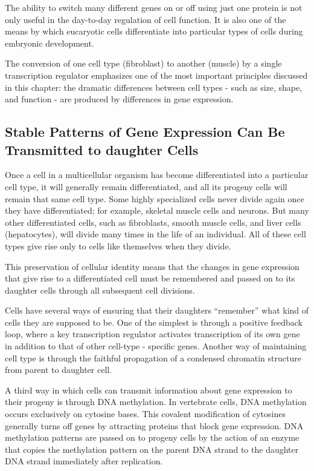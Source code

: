 The ability to switch many different genes on or off using just one protein
is not only useful in the day-to-day regulation of cell function. It is also
one of the means by which eucaryotic cells differentiate into particular
types of cells during embryonic development.

The conversion of one cell type (fibroblast) to another (muscle) by a single
transcription regulator emphasizes one of the most important principles
discussed in this chapter: the dramatic differences between cell types -
such as size, shape, and function - are produced by differences in gene
expression.

\subsection{Stable Patterns of Gene Expression Can Be Transmitted to daughter Cells}

Once a cell in a multicellular organism has become differentiated into a particular cell type, it will generally
remain differentiated, and all its progeny cells will remain that same cell
type. Some highly specialized cells never divide again once they have
differentiated; for example, skeletal muscle cells and neurons. But many
other differentiated cells, such as fibroblasts, smooth muscle cells, and
liver cells (hepatocytes), will divide many times in the life of an individual.
All of these cell types give rise only to cells like themselves when
they divide.

This preservation of cellular identity means that the changes in gene
expression that give rise to a differentiated cell must be remembered and
passed on to its daughter cells through all subsequent cell divisions.

Cells have several ways of ensuring that their daughters “remember”
what kind of cells they are supposed to be. One of the simplest is through
a positive feedback loop, where a key transcription regulator activates
transcription of its own gene in addition to that of other cell-type - specific
genes. Another way of maintaining cell type is through
the faithful propagation of a condensed chromatin structure from parent
to daughter cell.

A third way in which cells can transmit information about gene expression
to their progeny is through DNA methylation. In vertebrate cells,
DNA methylation occurs exclusively on cytosine bases. This
covalent modification of cytosines generally turns off genes by attracting
proteins that block gene expression. DNA methylation patterns are
passed on to progeny cells by the action of an enzyme that copies the
methylation pattern on the parent DNA strand to the daughter DNA strand
immediately after replication.

